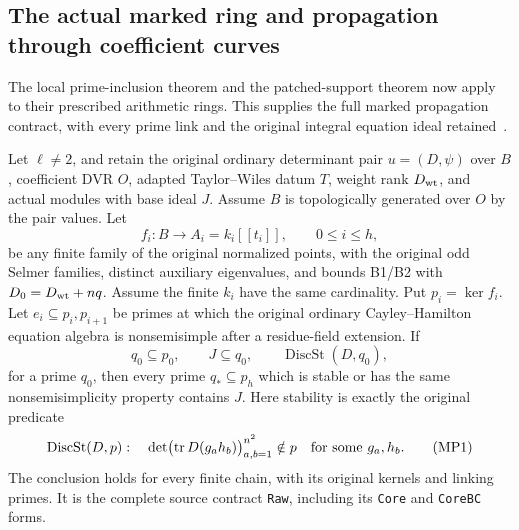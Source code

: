 \subsection{The actual marked ring and propagation through coefficient curves}
\label{sec:selmer-marked-propagation}

The local prime-inclusion theorem and the patched-support theorem now
apply to their prescribed arithmetic rings.  This supplies the full
marked propagation contract, with every prime link and the original
integral equation ideal retained~\cite{SelmerMarkedSource}.

\begin{theorem}\label{thm:selmer-marked-propagation}
Let $\ell\ne2$, and retain the original ordinary determinant pair
$u=(D,\psi)$ over $B$, coefficient DVR $O$, adapted Taylor--Wiles datum
$T$, weight rank $D_{\rm wt}$, and actual modules with base ideal $J$.
Assume $B$ is topologically generated over $O$ by the pair values.
Let
\[
 f_i:B\longrightarrow A_i=k_i[[t_i]],\qquad 0\le i\le h,
\]
be any finite family of the original normalized points, with the
original odd Selmer families, distinct auxiliary eigenvalues, and
bounds B1/B2 with $D_0=D_{\rm wt}+nq$.
Assume the finite $k_i$ have the same cardinality.  Put $p_i=\ker f_i$.
Let $e_i\subseteq p_i,p_{i+1}$ be primes at which the original ordinary
Cayley--Hamilton equation algebra is nonsemisimple after a residue-field
extension.  If
\[
 q_0\subseteq p_0,\qquad J\subseteq q_0,\qquad
                         \operatorname{DiscSt}(D,q_0),
\]
for a prime $q_0$, then every prime $q_*\subseteq p_h$ which is stable
or has the same nonsemisimplicity property contains $J$.
Here stability is exactly the original predicate
\[
 \operatorname{DiscSt}(D,p):\quad
 \det\bigl(\operatorname{tr}D(g_a h_b)\bigr)_{a,b=1}^{n^2}\notin p
                  \quad\hbox{for some }g_a,h_b.             \tag{MP1}
\]
The conclusion holds for every finite chain, with its original kernels
and linking primes.  It is the complete source contract \texttt{Raw},
including its \texttt{Core} and \texttt{CoreBC} forms.
\end{theorem}

